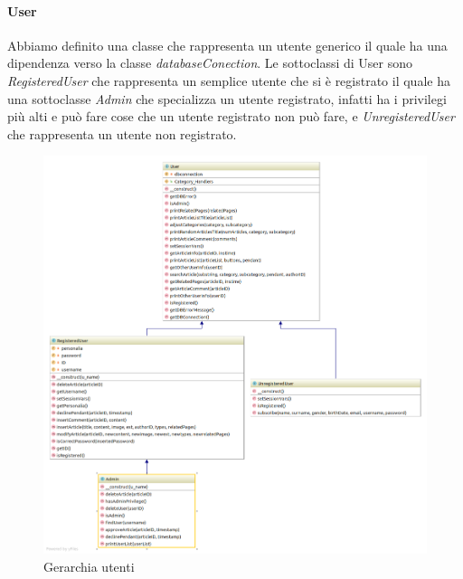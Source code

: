 \paragraph{User} Abbiamo definito una classe che rappresenta un utente generico il quale ha una dipendenza verso la classe \textit{databaseConection}. Le sottoclassi di User sono \textit{RegisteredUser} che rappresenta un semplice utente che si è registrato il quale ha una sottoclasse \textit{Admin} che specializza un utente registrato, infatti ha i privilegi più alti e può fare cose che un utente registrato non può fare, e \textit{UnregisteredUser} che rappresenta un utente non registrato.
\begin{figure}[H]
	\begin{center}
		\includegraphics[width=14cm]{img/User.png}
		\caption{Gerarchia utenti}
	\end{center}
\end{figure}

